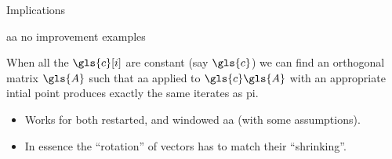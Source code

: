 \documentclass[aspectratio=169]{beamer}
\begin{document}
\begin{frame}{Implications}
\end{frame}

\begin{frame}{\gls{aa} no improvement examples}

    When all the $\gls{c}[i]$ are constant (say $\gls{c}$) we can find an orthogonal
    matrix $\gls{A}$ such that \gls{aa} applied to $\gls{c}\gls{A}$ with an appropriate
    intial point produces exactly the same iterates as \gls{pi}.

    \begin{itemize}
        \item Works for both restarted, and windowed \gls{aa} (with some assumptions).
        \item In essence the ``rotation'' of vectors has to match their ``shrinking''.
    \end{itemize}


\end{frame}
\end{document}
